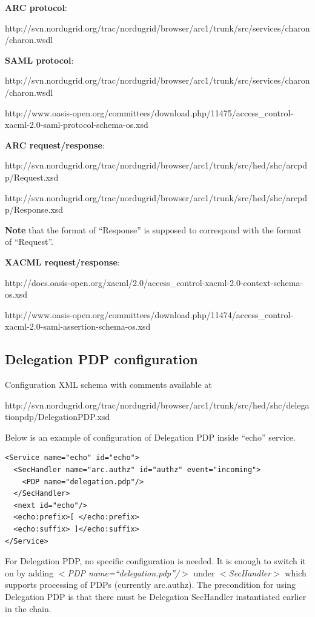 \documentclass{article}                            %
\begin{document}
\textbf{ARC protocol}:

http://svn.nordugrid.org/trac/nordugrid/browser/arc1/trunk/src/services/charon/charon.wsdl

\textbf{SAML protocol}:

http://svn.nordugrid.org/trac/nordugrid/browser/arc1/trunk/src/services/charon/charon.wsdl

http://www.oasis-open.org/committees/download.php/11475/access\_control-xacml-2.0-saml-protocol-schema-os.xsd

\textbf{ARC request/response}:

http://svn.nordugrid.org/trac/nordugrid/browser/arc1/trunk/src/hed/shc/arcpdp/Request.xsd

http://svn.nordugrid.org/trac/nordugrid/browser/arc1/trunk/src/hed/shc/arcpdp/Response.xsd

\textbf{Note} that the format of ``Response'' is supposed to correspond with the format of ``Request''. 

\textbf{XACML request/response}:

http://docs.oasis-open.org/xacml/2.0/access\_control-xacml-2.0-context-schema-os.xsd

http://www.oasis-open.org/committees/download.php/11474/access\_control-xacml-2.0-saml-assertion-schema-os.xsd


\subsection{Delegation PDP configuration} %
\label{subsec:delegpdp_conf}
Configuration XML schema with comments available at 

http://svn.nordugrid.org/trac/nordugrid/browser/arc1/trunk/src/hed/shc/delegationpdp/DelegationPDP.xsd

Below is an example of configuration of Delegation PDP inside ``echo'' service.

\begin{verbatim}
<Service name="echo" id="echo">
  <SecHandler name="arc.authz" id="authz" event="incoming">
    <PDP name="delegation.pdp"/>
  </SecHandler>
  <next id="echo"/>
  <echo:prefix>[ </echo:prefix>
  <echo:suffix> ]</echo:suffix>
</Service>
\end{verbatim}

For Delegation PDP, no specific configuration is needed. It is enough to switch it on by adding \textit{$<$PDP name=``delegation.pdp''/$>$} under \textit{$<$SecHandler$>$} which supports processing of PDPs (currently arc.authz).
The precondition for using Delegation PDP is that there must be Delegation SecHandler instantiated earlier in the chain.
\end{document}
